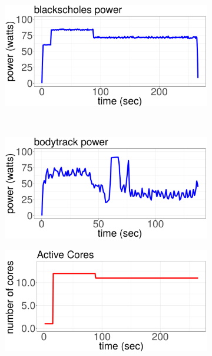 \begin{figure}[!ht]
	\centering
\begin{subfigure}[b]{.45\textwidth}
  	\includegraphics[width=\textwidth]{power_aware_job_scheduling/figures/activity_ratios/blackscholes_pkg_power}
  \end{subfigure}%
~
	\begin{subfigure}[b]{.45\textwidth}
  	\includegraphics[width=\textwidth]{power_aware_job_scheduling/figures/activity_ratios/bodytrack_pkg_power}
	\end{subfigure}%
\vspace{0.1cm}
	\begin{subfigure}[b]{.45\textwidth}
  	\includegraphics[width=\textwidth]{power_aware_job_scheduling/figures/activity_ratios/blackscholes_CORES}

\end{subfigure}
\end{figure}
